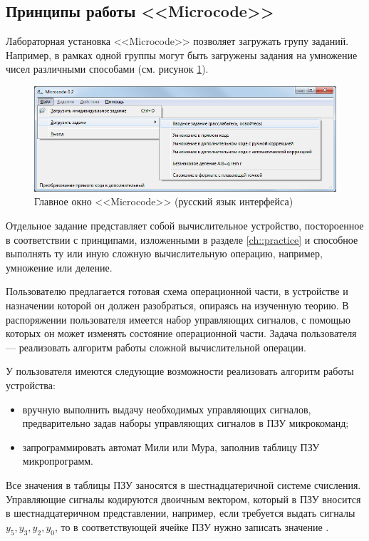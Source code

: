 \subsection{Принципы работы <<Microcode>>}

Лабораторная установка <<Microcode>> позволяет загружать групу заданий. Например, в рамках одной группы могут быть загружены задания на умножение чисел различными способами (см. рисунок \ref{fig:mic:MicWindow}).

\begin{figure}
    \centering
    \includegraphics[width=\textwidth]{fig/MicWindow}
    \caption{Главное окно <<Microcode>> (русский язык интерфейса)}\label{fig:mic:MicWindow}
\end{figure}

Отдельное задание представляет собой вычислительное устройство, постороенное в соответствии с принципами, изложенными в разделе \ref{ch::practice} и способное выполнять ту или иную сложную вычислительную операцию, например, умножение или деление.

Пользователю предлагается готовая схема операционной части, в устройстве и назначении которой он должен разобраться, опираясь на изученную теорию. В распоряжении пользователя имеется набор управляющих сигналов, с помощью которых он может изменять состояние операционной части. Задача пользователя --- реализовать алгоритм работы сложной вычислительной операции.

У пользователя имеются следующие возможности реализовать алгоритм работы устройства:
\begin{itemize}
    \item вручную выполнить выдачу необходимых управляющих сигналов, предварительно задав наборы управляющих сигналов в ПЗУ микрокоманд;
    \item запрограммировать автомат Мили или Мура, заполнив таблицу ПЗУ микропрограмм.
\end{itemize}

Все значения в таблицы ПЗУ заносятся в шестнадцатеричной системе счисления. Управляющие сигналы кодируются двоичным вектором, который в ПЗУ вносится в шестнадцатеричном представлении, например, если требуется выдать сигналы $y_5,y_3,y_2,y_0$, то в соответствующей ячейке ПЗУ нужно записать значение .

